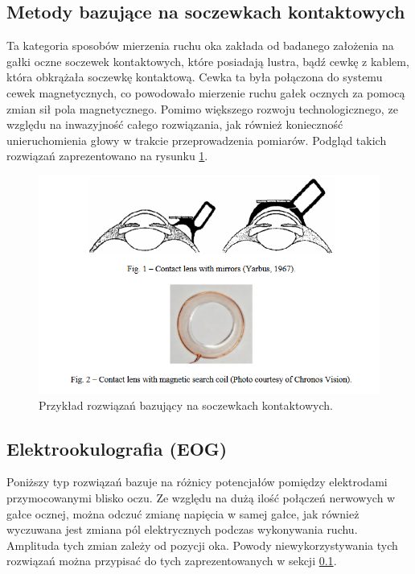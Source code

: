 \subsection{Metody bazujące na soczewkach kontaktowych}
\label{ssec:lenses}
Ta kategoria sposobów mierzenia ruchu oka zakłada od badanego założenia na gałki oczne soczewek kontaktowych, które posiadają lustra, bądź cewkę z kablem, która obkrążała soczewkę kontaktową. Cewka ta była połączona do systemu cewek magnetycznych, co powodowało mierzenie ruchu gałek ocznych za pomocą zmian sił pola magnetycznego. Pomimo większego rozwoju technologicznego, ze względu na inwazyjność całego rozwiązania, jak również konieczność unieruchomienia głowy w trakcie przeprowadzenia pomiarów. Podgląd takich rozwiązań zaprezentowano na rysunku \ref{fig:soczewki}.
\begin{figure}[H]
    \centering
    \captionsetup{justification=centering,margin=2cm}
    \includegraphics[width=0.9\linewidth]{resources/soczewki.png}
    \caption{Przykład rozwiązań bazujący na soczewkach kontaktowych.}
    \label{fig:soczewki}
\end{figure}
\subsection{Elektrookulografia (EOG)}
\label{ssec:eog}
Poniższy typ rozwiązań bazuje na różnicy potencjałów pomiędzy elektrodami przymocowanymi blisko oczu. Ze względu na dużą ilość połączeń nerwowych w gałce ocznej, można odczuć zmianę napięcia w samej gałce, jak również wyczuwana jest zmiana pól elektrycznych podczas wykonywania ruchu. Amplituda tych zmian zależy od pozycji oka. Powody niewykorzystywania tych rozwiązań można przypisać do tych zaprezentowanych w sekcji \ref{ssec:lenses}.
